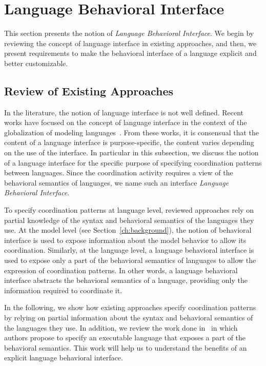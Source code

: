 \section{Language Behavioral Interface}
This section presents the notion of \emph{Language Behavioral Interface}. We begin by reviewing the concept of language interface in existing approaches, and then, we present requirements to make the behavioral interface of a language explicit and better customizable.    

\subsection{Review of Existing Approaches}

In the literature, the notion of language interface is not well defined. Recent works have focused on the concept of language interface in the context of the globalization of modeling languages~\cite{GML_ch1,GML_ch3,GML_ch4,degueule2015melange}. From these works, it is consensual that the content of a language interface is purpose-specific, \ie the content varies depending on the use of the interface. In particular in this subsection, we discuss the notion of a language interface for the specific purpose of specifying coordination patterns between languages. Since the coordination activity requires a view of the behavioral semantics of languages, we name such an interface \emph{Language Behavioral Interface}.
	
To specify coordination patterns at language level, reviewed approaches rely on partial knowledge of the syntax and behavioral semantics of the languages they use. At the model level (see Section~\ref{ch:background}), the notion of behavioral interface is used to expose information about the model behavior to allow its coordination. Similarly, at the language level, a language behavioral interface is used to expose only a part of the behavioral semantics of languages to allow the expression of coordination patterns. In other words, a language behavioral interface abstracts the behavioral semantics of a language, providing only the information required to coordinate it. 
 
In the following, we show how existing approaches specify coordination patterns by relying on partial information about the syntax and behavioral semantics of the languages they use. In addition, we review the work done in~\cite{sle13-combemale} in which authors propose to specify an executable language that exposes a part of the behavioral semantics. This work will help us to understand the benefits of an explicit language behavioral interface.    

